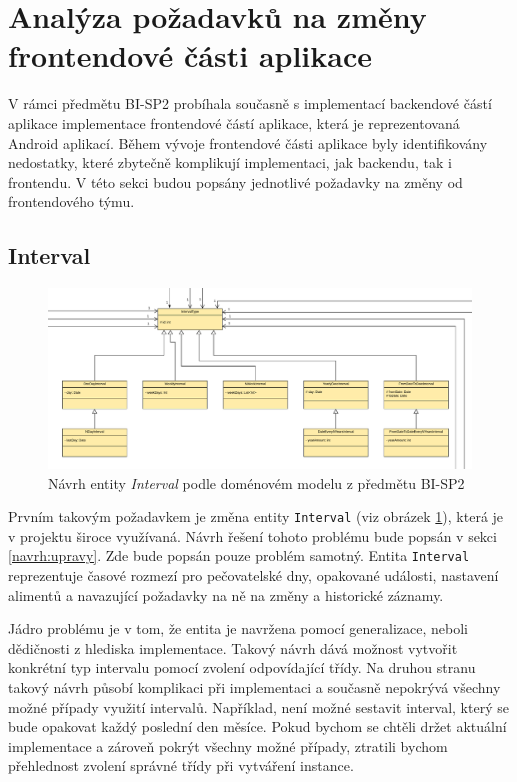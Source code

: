 \section{Analýza požadavků na změny frontendové části aplikace}\label{analyza:pozadavky-frontendu}
    V rámci předmětu BI-SP2 probíhala současně s implementací backendové částí aplikace implementace frontendové částí aplikace, která je reprezentovaná Android aplikací. Během vývoje frontendové části aplikace byly identifikovány nedostatky, které zbytečně komplikují implementaci, jak backendu, tak i frontendu. V této sekci budou popsány jednotlivé požadavky na změny od frontendového týmu.
    
    \subsection{Interval}\label{analyza:pozadavky:interval}
        \begin{figure}\centering
	        \includegraphics[width=1.0\textwidth]{pdfs/Interval1}
	        \caption[Současný návrh entity \texttt{Interval}]{Návrh entity \textit{Interval} podle doménovém modelu z předmětu BI-SP2}\label{image:Interval1}
        \end{figure}
        Prvním takovým požadavkem je změna entity \verb|Interval| (viz obrázek \ref{image:Interval1}), která je v projektu široce využívaná. Návrh řešení tohoto problému bude popsán v sekci \ref{navrh:upravy}. Zde bude popsán pouze problém samotný. Entita \verb|Interval| reprezentuje časové rozmezí pro pečovatelské dny, opakované události, nastavení alimentů a navazující požadavky na ně na změny a historické záznamy.
            
        Jádro problému je v tom, že entita je navržena pomocí generalizace, neboli dědičnosti z hlediska implementace. Takový návrh dává možnost vytvořit konkrétní typ intervalu pomocí zvolení odpovídající třídy. Na druhou stranu takový návrh působí komplikaci při implementaci a současně nepokrývá všechny možné případy využití intervalů. Například, není možné sestavit interval, který se bude opakovat každý poslední den měsíce. Pokud bychom se chtěli držet aktuální implementace a zároveň pokrýt všechny možné případy, ztratili bychom přehlednost zvolení správné třídy při vytváření instance.
            
